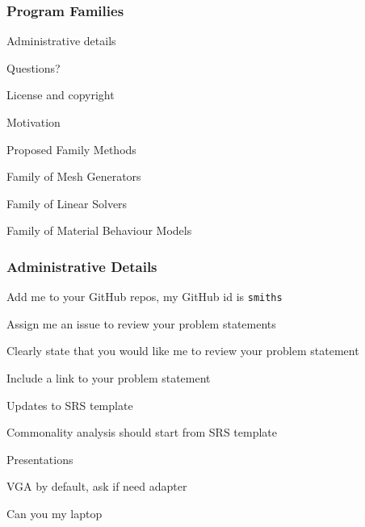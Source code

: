 \documentclass[t,12pt,numbers,fleqn]{beamer}
\newcounter{temp}
\begin{document}



\begin{frame}
\frametitle{Program Families}

\bi
\item Administrative details
\item Questions?
\item License and copyright
\item Motivation
\item Proposed Family Methods
\item Family of Mesh Generators
\item Family of Linear Solvers
\item Family of Material Behaviour Models
\ei
\end{frame}


\begin{frame}
\frametitle{Administrative Details}

\bi
\item Add me to your GitHub repos, my GitHub id is \texttt{smiths}
\item Assign me an issue to review your problem statements
\bi
\item Clearly state that you would like me to review your problem statement
\item Include a link to your problem statement
\ei
\item Updates to SRS template
\item Commonality analysis should start from SRS template
\item Presentations
\bi
\item VGA by default, ask if need adapter
\item Can you my laptop
\ei
\ei

\end{frame}

\end{document}
